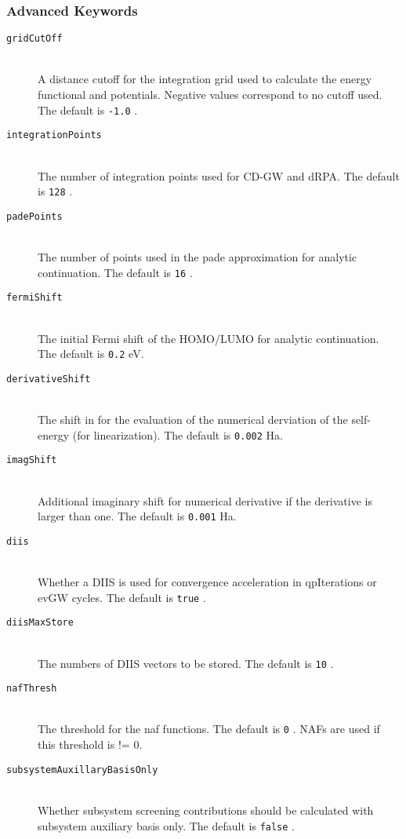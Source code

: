 \documentclass[bibliography=totocnumbered,a4paper,10pt,oneside]{scrbook}
\newcommand{\ttt}[1]{%
  \begingroup\setlength{\fboxsep}{1pt}%
  \colorbox{serenity-green!30}{\texttt{\hspace*{2pt}\vphantom{(g}#1\hspace*{2pt}}}%
  \endgroup
}
\begin{document}
\subsubsection{Advanced Keywords}
\begin{description}
  \item [\texttt{gridCutOff}]\hfill \\
  A distance cutoff for the integration grid used to calculate the energy functional and potentials. Negative values correspond to no cutoff used. The default is \ttt{-1.0}.
  \item [\texttt{integrationPoints}]\hfill \\
  The number of integration points used for CD-GW and dRPA. The default is \ttt{128}.
  \item [\texttt{padePoints}]\hfill \\
  The number of points used in the pade approximation for analytic continuation. The default is \ttt{16}.
  \item [\texttt{fermiShift}]\hfill \\
  The initial Fermi shift of the HOMO/LUMO for analytic continuation. The default is \ttt{0.2} eV.  
  \item [\texttt{derivativeShift}]\hfill \\
  The shift in for the evaluation of the numerical derviation of the self-energy (for linearization). The default is \ttt{0.002} Ha.
  \item [\texttt{imagShift}]\hfill \\
  Additional imaginary shift for numerical derivative if the derivative is larger than one. The default is \ttt{0.001} Ha.
  \item [\texttt{diis}]\hfill \\
  Whether a DIIS is used for convergence acceleration in qpIterations or evGW cycles. The default is \ttt{true}.
  \item [\texttt{diisMaxStore}]\hfill \\
  The numbers of DIIS vectors to be stored. The default is \ttt{10}.
  \item [\texttt{nafThresh}]\hfill \\
  The threshold for the naf functions. The default is \ttt{0}. NAFs are used if this threshold is != 0.
  \item [\texttt{subsystemAuxillaryBasisOnly}]\hfill \\
  Whether subsystem screening contributions should be calculated with subsystem auxiliary basis only. The default is \ttt{false}.

\end{description}
\end{document}
